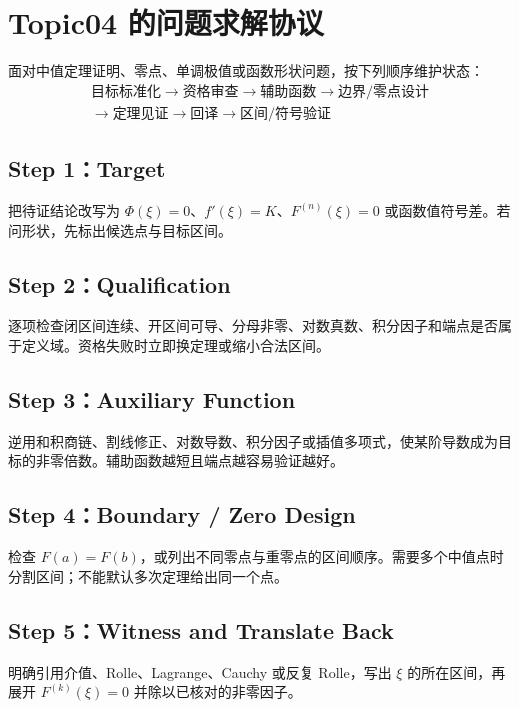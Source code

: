 \documentclass[UTF8,fontset=none,11pt,a4paper]{ctexart}
\begin{document}
\section{Topic04 的问题求解协议}

面对中值定理证明、零点、单调极值或函数形状问题，按下列顺序维护状态：
\[
\boxed{
\begin{gathered}
\text{目标标准化}\to\text{资格审查}\to\text{辅助函数}\to\text{边界/零点设计}\\
\to\text{定理见证}\to\text{回译}\to\text{区间/符号验证}
\end{gathered}}
\]

\subsection{Step 1：Target}

把待证结论改写为 $\Phi(\xi)=0$、$f'(\xi)=K$、$F^{(n)}(\xi)=0$ 或函数值符号差。若问形状，先标出候选点与目标区间。

\subsection{Step 2：Qualification}

逐项检查闭区间连续、开区间可导、分母非零、对数真数、积分因子和端点是否属于定义域。资格失败时立即换定理或缩小合法区间。

\subsection{Step 3：Auxiliary Function}

逆用和积商链、割线修正、对数导数、积分因子或插值多项式，使某阶导数成为目标的非零倍数。辅助函数越短且端点越容易验证越好。

\subsection{Step 4：Boundary / Zero Design}

检查 $F(a)=F(b)$，或列出不同零点与重零点的区间顺序。需要多个中值点时分割区间；不能默认多次定理给出同一个点。

\subsection{Step 5：Witness and Translate Back}

明确引用介值、Rolle、Lagrange、Cauchy 或反复 Rolle，写出 $\xi$ 的所在区间，再展开 $F^{(k)}(\xi)=0$ 并除以已核对的非零因子。
\end{document}
